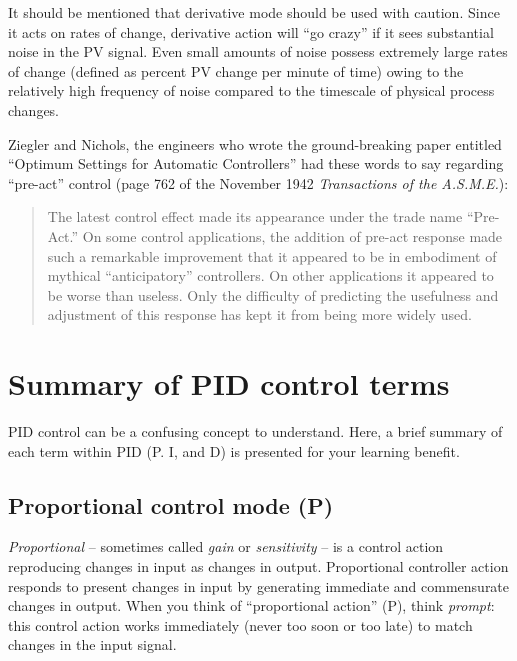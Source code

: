 It should be mentioned that derivative mode should be used with caution.  Since it acts on rates of change, derivative action will ``go crazy'' if it sees substantial noise in the PV signal.  Even small amounts of noise possess extremely large rates of change (defined as percent PV change per minute of time) owing to the relatively high frequency of noise compared to the timescale of physical process changes.

Ziegler and Nichols, the engineers who wrote the ground-breaking paper entitled ``Optimum Settings for Automatic Controllers'' had these words to say regarding ``pre-act'' control (page 762 of the November 1942 \textit{Transactions of the A.S.M.E.}):

\begin{quote}

The latest control effect made its appearance under the trade name ``Pre-Act.''  On some control applications, the addition of pre-act response made such a remarkable improvement that it appeared to be in embodiment of mythical ``anticipatory'' controllers.  On other applications it appeared to be worse than useless.  Only the difficulty of predicting the usefulness and adjustment of this response has kept it from being more widely used.

\end{quote}







\filbreak
\section{Summary of PID control terms}

PID control can be a confusing concept to understand.  Here, a brief summary of each term within PID (P. I, and D) is presented for your learning benefit.




\filbreak
\subsection{Proportional control mode (P)}

\textit{Proportional} -- sometimes called \textit{gain} or \textit{sensitivity} -- is a control action reproducing changes in input as changes in output.  Proportional controller action responds to present changes in input by generating immediate and commensurate changes in output.  When you think of ``proportional action'' (P), think \textit{prompt}: this control action works immediately (never too soon or too late) to match changes in the input signal.

